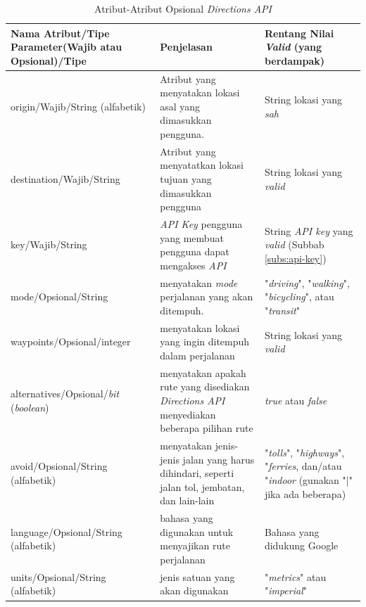 \begin{table}[h]
	\centering
	\caption{Atribut-Atribut Opsional \textit{Directions API}}
	\label{tab:atribut-directions-api}
	\begin{tabular}{|p{5cm}|p{6cm}|p{5cm}|}

	\hline
	Nama Atribut/Tipe Parameter(Wajib atau Opsional)/Tipe & Penjelasan & Rentang Nilai \textit{Valid} (yang berdampak)\\ \hline \hline
	origin/Wajib/String (alfabetik) &  Atribut yang menyatakan lokasi asal yang dimasukkan pengguna. & String lokasi yang \textit{sah} \\ \hline
	destination/Wajib/String & Atribut yang menyatatkan lokasi tujuan yang dimasukkan pengguna & String lokasi yang \textit{valid} \\ \hline
	key/Wajib/String & \textit{API Key} pengguna yang membuat pengguna dapat mengakses \textit{API} &  String \textit{API key} yang \textit{valid} (Subbab \ref{subs:api-key})  \\ \hline
	mode/Opsional/String & menyatakan \textit{mode} perjalanan yang akan ditempuh. & "\textit{driving}", "\textit{walking}", "\textit{bicycling}", atau "\textit{transit}"\\ \hline
	waypoints/Opsional/integer & menyatakan lokasi yang ingin ditempuh dalam perjalanan & String lokasi yang \textit{valid} \\ \hline
	alternatives/Opsional/\textit{bit} (\textit{boolean}) & menyatakan apakah rute yang disediakan \textit{Directions API} menyediakan beberapa pilihan rute & \textit{true} atau \textit{false} \\ \hline
	avoid/Opsional/String (alfabetik) & menyatakan jenis-jenis jalan yang harus dihindari, seperti jalan tol, jembatan, dan lain-lain & "\textit{tolls}", "\textit{highways}", "\textit{ferries}, dan/atau "\textit{indoor} (gunakan "|" jika ada beberapa) \\ \hline
	language/Opsional/String (alfabetik) & bahasa yang digunakan untuk menyajikan rute perjalanan & Bahasa yang didukung Google \\ \hline
	units/Opsional/String (alfabetik) & jenis satuan yang akan digunakan & "\textit{metrics}" atau "\textit{imperial}"\\ \hline

\end{tabular}
\end{table}
